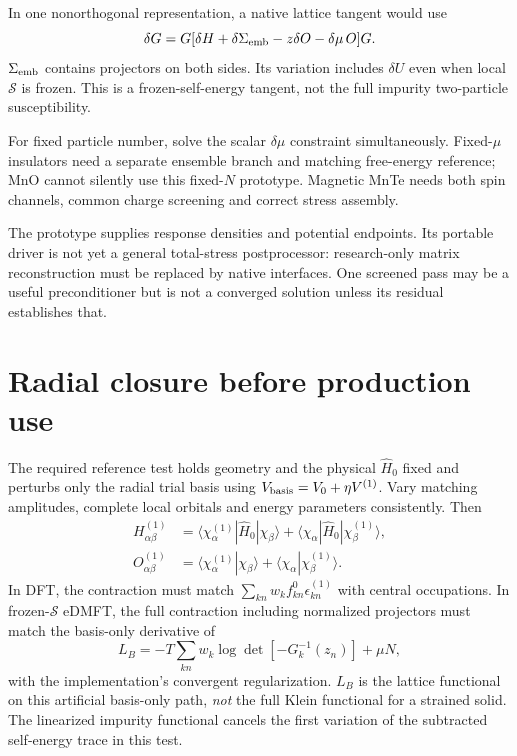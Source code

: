 \documentclass[11pt]{article}
\newcommand{\Sig}{\mathcal S}
\begin{document}
In one nonorthogonal representation, a native lattice tangent would use
\begin{equation}
\delta G=G[\delta H+\delta\Sigma_{\rm emb}-z\delta O-\delta\mu\,O]G.
\end{equation}
$\Sigma_{\rm emb}$ contains projectors on both sides. Its variation includes $\delta U$ even when local $\Sig$ is frozen. This is a frozen-self-energy tangent, not the full impurity two-particle susceptibility.

For fixed particle number, solve the scalar $\delta\mu$ constraint simultaneously. Fixed-$\mu$ insulators need a separate ensemble branch and matching free-energy reference; MnO cannot silently use this fixed-$N$ prototype. Magnetic MnTe needs both spin channels, common charge screening and correct stress assembly.

The prototype supplies response densities and potential endpoints. Its portable driver is not yet a general total-stress postprocessor: research-only matrix reconstruction must be replaced by native interfaces. One screened pass may be a useful preconditioner but is not a converged solution unless its residual establishes that.

\section{Radial closure before production use}
The required reference test holds geometry and the physical $\hat H_0$ fixed and perturbs only the radial trial basis using $V_{\rm basis}=V_0+\eta V^{(1)}$. Vary matching amplitudes, complete local orbitals and energy parameters consistently. Then
\begin{align}
H^{(1)}_{\alpha\beta}&=\langle\chi_\alpha^{(1)}|\hat H_0|\chi_\beta\rangle+
\langle\chi_\alpha|\hat H_0|\chi_\beta^{(1)}\rangle,\\
O^{(1)}_{\alpha\beta}&=\langle\chi_\alpha^{(1)}|\chi_\beta\rangle+
\langle\chi_\alpha|\chi_\beta^{(1)}\rangle.
\end{align}
In DFT, the contraction must match $\sum_{kn}w_k f_{kn}^0\epsilon_{kn}^{(1)}$ with central occupations. In frozen-$\Sig$ eDMFT, the full contraction including normalized projectors must match the basis-only derivative of
\begin{equation}
L_B=-T\sum_{kn}w_k\log\det[-G_k^{-1}(z_n)]+\mu N,
\end{equation}
with the implementation's convergent regularization. $L_B$ is the lattice functional on this artificial basis-only path, \emph{not} the full Klein functional for a strained solid. The linearized impurity functional cancels the first variation of the subtracted self-energy trace in this test.
\end{document}
